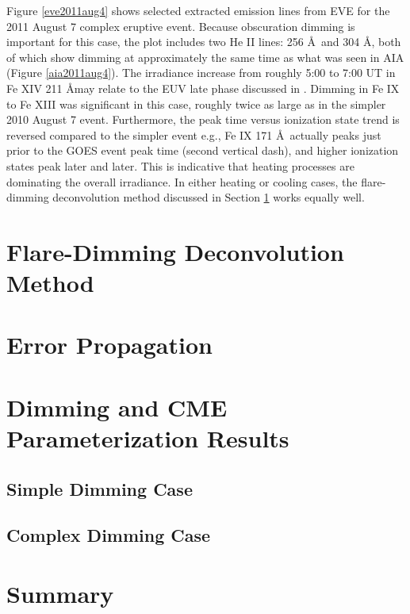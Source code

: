 Figure \ref{eve2011aug4} shows selected extracted emission lines from EVE for the 2011 August 7 complex eruptive event. Because obscuration dimming is important for this case, the plot includes two He II lines: 256 \AA\ and 304 \AA, both of which show dimming at approximately the same time as what was seen in AIA (Figure \ref{aia2011aug4}). The irradiance increase from roughly 5:00 to 7:00 UT in Fe XIV 211 \AA may relate to the EUV late phase discussed in \citet{Woods2011}. Dimming in Fe IX to Fe XIII was significant in this case, roughly twice as large as in the simpler 2010 August 7 event. Furthermore, the peak time versus ionization state trend is reversed compared to the simpler event e.g., Fe IX 171 \AA\ actually peaks just prior to the GOES event peak time (second vertical dash), and higher ionization states peak later and later. This is indicative that heating processes are dominating the overall irradiance. In either heating or cooling cases, the flare-dimming deconvolution method discussed in Section \ref{sec:deconvolve} works equally well. 


\section{Flare-Dimming Deconvolution Method}
\label{sec:deconvolve}

\section{Error Propagation}
\label{sec:deconvolveerrors}

\section{Dimming and CME Parameterization Results}
\label{sec:casestudyresults}

\subsection{Simple Dimming Case}

\subsection{Complex Dimming Case}

\section{Summary}














